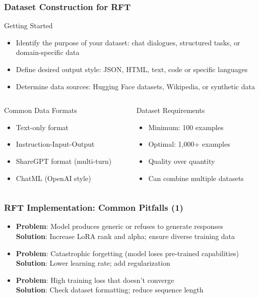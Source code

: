 \documentclass[aspectratio=169]{beamer}
\begin{document}
\begin{frame}
	\frametitle{Dataset Construction for RFT}
	\begin{block}{Getting Started}
		\begin{itemize}
			\item Identify the purpose of your dataset: chat dialogues, structured tasks, or domain-specific data
			\item Define desired output style: JSON, HTML, text, code or specific languages
			\item Determine data sources: Hugging Face datasets, Wikipedia, or synthetic data
		\end{itemize}
	\end{block}
	\begin{columns}
		\begin{column}{0.48\textwidth}
			\begin{block}{Common Data Formats}
				\begin{itemize}
					\item Text-only format
					\item Instruction-Input-Output
					\item ShareGPT format (multi-turn)
					\item ChatML (OpenAI style)
				\end{itemize}
			\end{block}
		\end{column}
		\begin{column}{0.48\textwidth}
			\begin{block}{Dataset Requirements}
				\begin{itemize}
					\item Minimum: 100 examples
					\item Optimal: 1,000+ examples
					\item Quality over quantity
					\item Can combine multiple datasets
				\end{itemize}
			\end{block}
		\end{column}
	\end{columns}
\end{frame}

\begin{frame}
	\frametitle{RFT Implementation: Common Pitfalls (1)}
	\begin{itemize}
		\item \textbf{Problem}: Model produces generic or refuses to generate responses\\
		  \textbf{Solution}: Increase LoRA rank and alpha; ensure diverse training data
		\item \textbf{Problem}: Catastrophic forgetting (model loses pre-trained capabilities)\\
		  \textbf{Solution}: Lower learning rate; add regularization
		\item \textbf{Problem}: High training loss that doesn't converge\\
		  \textbf{Solution}: Check dataset formatting; reduce sequence length
	\end{itemize}
\end{frame}
\end{document}
